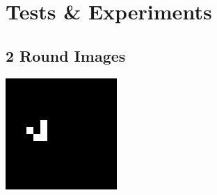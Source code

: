\documentclass[11pt, oneside]{article}
\newenvironment{Figure}
  {\par\medskip\noindent\minipage{\linewidth}}
  {\endminipage\par\medskip}
\begin{document}
\pagebreak
\section{Tests \& Experiments}


\subsection{2 Round Images}
\begin{multicols}{3}

\begin{Figure}
\includegraphics[width=\linewidth]{images/16x16_2_1.png}
\end{Figure}


\end{multicols}
\end{document}
